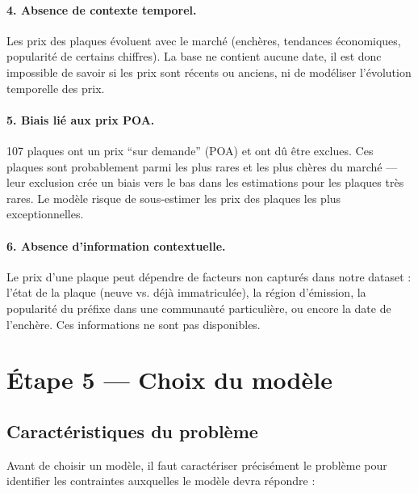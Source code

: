 \documentclass[12pt, a4paper]{article}
\begin{document}
\paragraph{4. Absence de contexte temporel.}
Les prix des plaques évoluent avec le marché (enchères, tendances économiques, popularité de certains chiffres). La base ne contient aucune date, il est donc impossible de savoir si les prix sont récents ou anciens, ni de modéliser l'évolution temporelle des prix.

\paragraph{5. Biais lié aux prix POA.}
107 plaques ont un prix ``sur demande'' (POA) et ont dû être exclues. Ces plaques sont probablement parmi les plus rares et les plus chères du marché — leur exclusion crée un biais vers le bas dans les estimations pour les plaques très rares. Le modèle risque de sous-estimer les prix des plaques les plus exceptionnelles.

\paragraph{6. Absence d'information contextuelle.}
Le prix d'une plaque peut dépendre de facteurs non capturés dans notre dataset : l'état de la plaque (neuve vs. déjà immatriculée), la région d'émission, la popularité du préfixe dans une communauté particulière, ou encore la date de l'enchère. Ces informations ne sont pas disponibles.

\section{Étape 5 — Choix du modèle}
\label{sec:choix_modele}

\subsection{Caractéristiques du problème}

Avant de choisir un modèle, il faut caractériser précisément le problème pour identifier les contraintes auxquelles le modèle devra répondre :
\end{document}
